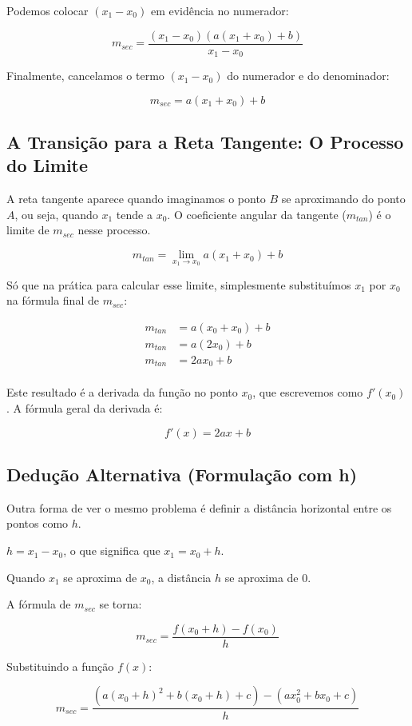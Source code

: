 \documentclass[../resumo.tex]{subfiles}
\begin{document}
	Podemos colocar $(x_1 - x_0)$ em evidência no numerador:

	\[ m_{sec} = \frac{(x_1 - x_0)(a(x_1 + x_0) + b)}{x_1 - x_0} \]

	Finalmente, cancelamos o termo $(x_1 - x_0)$ do numerador e do denominador:

	\[ m_{sec} = a(x_1 + x_0) + b \]

	\subsection{A Transição para a Reta Tangente: O Processo do Limite}

	A reta tangente aparece quando imaginamos o ponto $B$ se aproximando do ponto $A$, ou seja,
	quando $x_1$ tende a $x_0$. O coeficiente angular da tangente ($m_{tan}$) é o limite de $m_{sec}$ nesse processo.

	\[ m_{tan} = \lim_{x_1\to x_0} a(x_1 + x_0) + b \]

	Só que na prática para calcular esse limite, simplesmente substituímos $x_1$ por $x_0$ na fórmula final de $m_{sec}$:

	\begin{align*}
		m_{tan} &= a(x_0 + x_0) + b \\
		m_{tan} &= a(2x_0) + b \\
		m_{tan} &= 2ax_0 + b \\
	\end{align*}

	Este resultado é a derivada da função no ponto $x_0$, que escrevemos como $f'(x_0)$. A fórmula geral da derivada é:

	\[ f'(x) = 2ax + b \]

	\subsection{Dedução Alternativa (Formulação com h)}

	Outra forma de ver o mesmo problema é definir a distância horizontal entre os pontos como $h$.

	$h = x_1 - x_0$, o que significa que $x_1 = x_0 + h$.

	Quando $x_1$ se aproxima de $x_0$, a distância $h$ se aproxima de $0$.

	A fórmula de $m_{sec}$ se torna:

	\[ m_{sec} = \frac{f(x_0 + h) - f(x_0)}{h} \]

	Substituindo a função $f(x)$:

	\[ m_{sec} = \frac{(a(x_0 + h)^2 + b(x_0 + h) + c) - (ax_0^2 + bx_0 + c)}{h} \]
\end{document}
